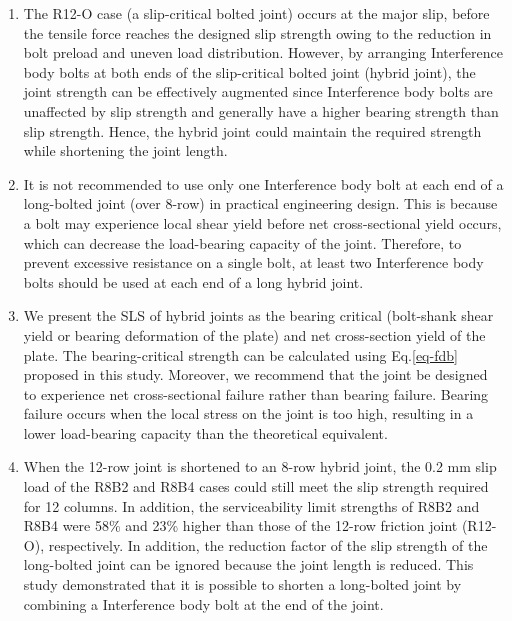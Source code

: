 \begin{enumerate}

\item The R12-O case (a slip-critical bolted joint) occurs at the major slip, before the tensile force reaches the designed slip strength owing to the reduction in bolt preload and uneven load distribution. However, by arranging Interference body bolts at both ends of the slip-critical bolted joint (hybrid joint), the joint strength can be effectively augmented since Interference body bolts are unaffected by slip strength and generally have a higher bearing strength than slip strength. Hence, the hybrid joint could maintain the required strength while shortening the joint length.

\item It is not recommended to use only one Interference body bolt at each end of a long-bolted joint (over 8-row) in practical engineering design. This is because a bolt may experience local shear yield before net cross-sectional yield occurs, which can decrease the load-bearing capacity of the joint. Therefore, to prevent excessive resistance on a single bolt, at least two Interference body bolts should be used at each end of a long hybrid joint.

\item We present the SLS of hybrid joints as the bearing critical (bolt-shank shear yield or bearing deformation of the plate) and net cross-section yield of the plate. The bearing-critical strength can be calculated using Eq.\ref{eq-fdb} proposed in this study. Moreover, we recommend that the joint be designed to experience net cross-sectional failure rather than bearing failure. Bearing failure occurs when the local stress on the joint is too high, resulting in a lower load-bearing capacity than the theoretical equivalent.

\item When the 12-row joint is shortened to an 8-row hybrid joint, the 0.2 mm slip load of the R8B2 and R8B4 cases could still meet the slip strength required for 12 columns. In addition, the serviceability limit strengths of R8B2 and R8B4 were 58\% and 23\% higher than those of the 12-row friction joint (R12-O), respectively. In addition, the reduction factor of the slip strength of the long-bolted joint can be ignored because the joint length is reduced. This study demonstrated that it is possible to shorten a long-bolted joint by combining a Interference body bolt at the end of the joint. 

\end{enumerate}



